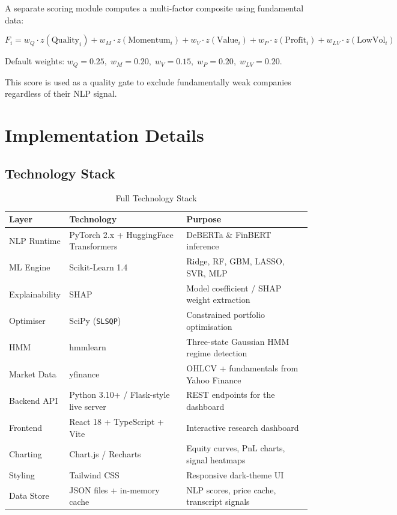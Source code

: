 \documentclass[12pt, a4paper]{article}
\begin{document}
A separate scoring module computes a multi-factor composite using fundamental data:

\begin{equation}
    F_i = w_Q \cdot z(\text{Quality}_i) + w_M \cdot z(\text{Momentum}_i) + w_V \cdot z(\text{Value}_i) + w_P \cdot z(\text{Profit}_i) + w_{LV} \cdot z(\text{LowVol}_i)
\end{equation}

Default weights: $w_Q = 0.25,\; w_M = 0.20,\; w_V = 0.15,\; w_P = 0.20,\; w_{LV} = 0.20$.

This score is used as a quality gate to exclude fundamentally weak companies regardless of their NLP signal.

\section{Implementation Details}

\subsection{Technology Stack}

\begin{table}[H]
\centering
\caption{Full Technology Stack}
\renewcommand{\arraystretch}{1.3}
\begin{tabular}{@{}lll@{}}
\toprule
\textbf{Layer} & \textbf{Technology} & \textbf{Purpose} \\ \midrule
NLP Runtime    & PyTorch 2.x + HuggingFace Transformers & DeBERTa \& FinBERT inference \\
ML Engine      & Scikit-Learn 1.4   & Ridge, RF, GBM, LASSO, SVR, MLP \\
Explainability & SHAP               & Model coefficient / SHAP weight extraction \\
Optimiser      & SciPy (\texttt{SLSQP}) & Constrained portfolio optimisation \\
HMM            & hmmlearn           & Three-state Gaussian HMM regime detection \\
Market Data    & yfinance           & OHLCV + fundamentals from Yahoo Finance \\
Backend API    & Python 3.10+ / Flask-style live server & REST endpoints for the dashboard \\
Frontend       & React 18 + TypeScript + Vite & Interactive research dashboard \\
Charting       & Chart.js / Recharts & Equity curves, PnL charts, signal heatmaps \\
Styling        & Tailwind CSS       & Responsive dark-theme UI \\
Data Store     & JSON files + in-memory cache & NLP scores, price cache, transcript signals \\
\bottomrule
\end{tabular}
\end{table}
\end{document}
